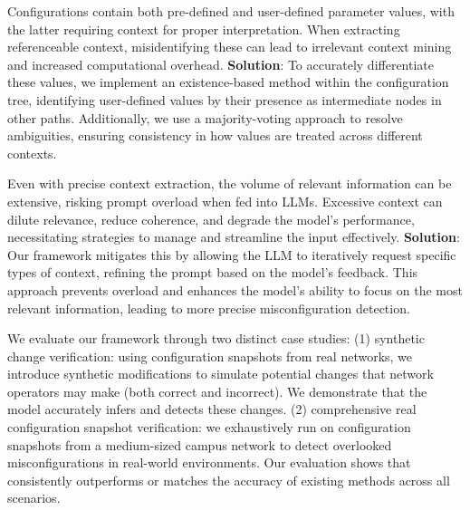 Configurations contain both pre-defined and user-defined parameter values, with the latter requiring context for proper interpretation. When extracting referenceable context, misidentifying these can lead to irrelevant context mining and increased computational overhead. \textbf{Solution}: To accurately differentiate these values, we implement an existence-based method within the configuration tree, identifying user-defined values by their presence as intermediate nodes in other paths. Additionally, we use a majority-voting approach to resolve ambiguities, ensuring consistency in how values are treated across different contexts.

Even with precise context extraction, the volume of relevant information can be extensive, risking prompt overload when fed into LLMs. Excessive context can dilute relevance, reduce coherence, and degrade the model’s performance, necessitating strategies to manage and streamline the input effectively. \textbf{Solution}: Our framework mitigates this by allowing the LLM to iteratively request specific types of context, refining the prompt based on the model’s feedback. This approach prevents overload and enhances the model’s ability to focus on the most relevant information, leading to more precise misconfiguration detection.

We evaluate our framework through two distinct case studies: (1) synthetic change verification: using configuration snapshots from real networks, we introduce synthetic modifications to simulate potential changes that network operators may make (both correct and incorrect). We demonstrate that the model accurately infers and detects these changes. (2) comprehensive real configuration snapshot verification: we exhaustively run \sysname{} on configuration snapshots from a medium-sized campus network to detect overlooked misconfigurations in real-world environments. Our evaluation shows that \sysname{} consistently outperforms or matches the accuracy of existing methods across all scenarios.
